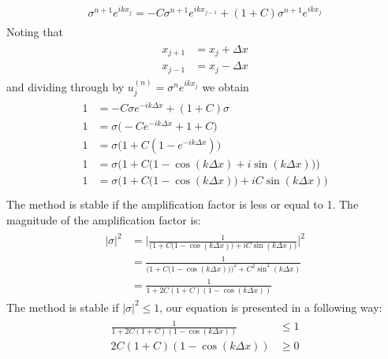 	\begin{align}
		\begin{split}
			\sigma ^{n+1}e^{ikx_j} =  -C\sigma^{n+1}e^{ikx_{j-1}} + (1+C)\sigma^{n+1}e^{ikx_j}
		\end{split}
	\end{align}
	Noting that	
	\begin{align}
		\begin{split}
			x_{j+1} &= x_j + \Delta x \\
			x_{j-1} &= x_j - \Delta x
		\end{split}
	\end{align}	
	and dividing through by $u_j^{(n)} = \sigma^ne^{ikx_j}$ we obtain
	\begin{align}
		\begin{split}
			1 &= -C\sigma e^{-ik \Delta x} + (1+C)\sigma\\ 
			1 &= \sigma \big(-Ce^{-ik \Delta x} + 1 + C\big)\\
			1 &= \sigma \big(1 + C(1 -e^{-ik \Delta x})\big)\\	
			1 &= \sigma \Big(1 + C\big(1- \cos(k\Delta x) + i\sin(k\Delta x)\big)\Big) \\
			1 &= \sigma \Big(1 + C\big(1- \cos(k\Delta x)\big)+ iC\sin(k\Delta x)\Big) \\	
		\end{split}
	\end{align}
	The method is stable if the amplification factor is less or equal to 1. The magnitude of the amplification factor is:
	\begin{align}
		\begin{split}
		\label{app:for:sigmaImplicit}
			|\sigma|^2 &= \Bigg|\frac{1}{\Big(1 + C\big(1- \cos(k\Delta x)\big)+ iC\sin(k\Delta x)\Big)}\Bigg|^2 \\	
			&= \frac{1}{\Big(1 + C\big(1- \cos(k\Delta x)\big)\Big)^2+ C^2\sin^2(k\Delta x)} \\
			&= \frac{1}{1 + 2C(1+C)(1-\cos(k\Delta x))}
		\end{split}
	\end{align} 
	The method is stable if $|\sigma|^2 \leq 1$, our equation is presented in a following way:	
	\begin{align}
		\begin{split}
			\frac{1}{1 + 2C(1+C)(1-\cos(k\Delta x))} &\leq 1 \\
			2C(1+C)(1-\cos(k\Delta x)) &\geq 0 \\
		\end{split}
	\end{align} 	
